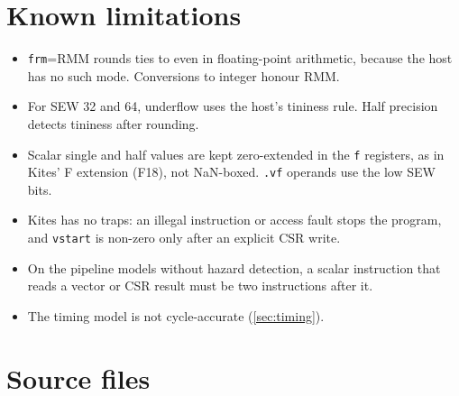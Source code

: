 \documentclass[11pt]{article}
\begin{document}
\section{Known limitations}\label{sec:limits}

\begin{itemize}
\item \texttt{frm}=RMM rounds ties to even in floating-point arithmetic, because the host has no
      such mode. Conversions to integer honour RMM.
\item For SEW 32 and 64, underflow uses the host's tininess rule. Half precision detects
      tininess after rounding.
\item Scalar single and half values are kept zero-extended in the \texttt{f} registers, as in
      Kites' F extension (F18), not NaN-boxed. \texttt{.vf} operands use the low SEW bits.
\item Kites has no traps: an illegal instruction or access fault stops the program, and
      \texttt{vstart} is non-zero only after an explicit CSR write.
\item On the pipeline models without hazard detection, a scalar instruction that reads a vector
      or CSR result must be two instructions after it.
\item The timing model is not cycle-accurate (\cref{sec:timing}).
\end{itemize}

\section{Source files}\label{sec:files}
\end{document}
